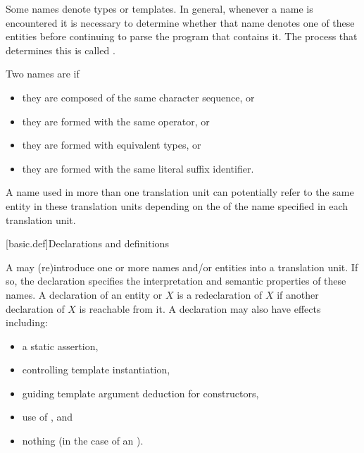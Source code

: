 \pnum
Some names denote types or templates. In general,
whenever a name is encountered it is necessary to determine whether that name denotes
one of these entities before continuing to parse the program that contains it. The
process that determines this is called
.

\pnum
Two names are  if
\begin{itemize}
\item they are  composed of the same character sequence, or
\item they are  formed with
the same operator, or
\item they are  formed
with equivalent types, or
\item they are  formed with
the same literal suffix identifier.
\end{itemize}

\pnum
{}%
%
A name used in more than one translation unit can potentially
refer to the same entity in these translation units depending on the
 of the name specified in each
translation unit.

[basic.def]{Declarations and definitions}

\pnum
{}%
%
%
A  may (re)introduce
one or more names and/or entities into a translation
unit.
If so, the
declaration specifies the interpretation and semantic properties of these names.
A declaration of an entity or  $X$ is
a redeclaration of $X$
if another declaration of $X$ is reachable from it.
A declaration may also have effects including:
\begin{itemize}
\item a static assertion,
\item controlling template instantiation,
\item guiding template argument deduction for constructors,
\item use of , and
\item nothing (in the case of an ).
\end{itemize}

